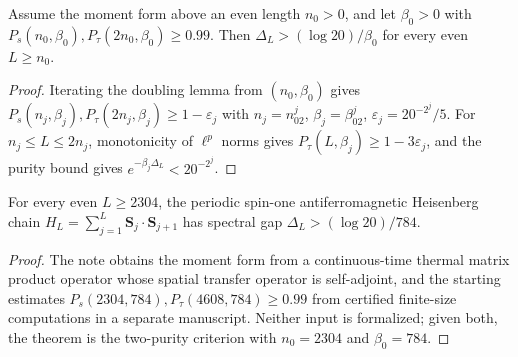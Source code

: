 \begin{proposition}\label{prop:two_purity_criterion}
    \leanok
    Assume the moment form above an even length $n_0>0$, and let $\beta_0>0$
    with $P_s(n_0,\beta_0),P_\tau(2n_0,\beta_0)\ge0.99$. Then
    $\Delta_L>(\log20)/\beta_0$ for every even $L\ge n_0$.
\end{proposition}

\begin{proof}
    \leanok
    Iterating the doubling lemma from $(n_0,\beta_0)$ gives
    $P_s(n_j,\beta_j),P_\tau(2n_j,\beta_j)\ge1-\varepsilon_j$ with
    $n_j=n_02^j$, $\beta_j=\beta_02^j$, $\varepsilon_j=20^{-2^j}/5$. For
    $n_j\le L\le2n_j$, monotonicity of $\ell^p$ norms gives
    $P_\tau(L,\beta_j)\ge1-3\varepsilon_j$, and the purity bound gives
    $e^{-\beta_j\Delta_L}<20^{-2^j}$.
\end{proof}

\begin{theorem}\label{thm:spin_one_heisenberg_gap}
    For every even $L\ge2304$, the periodic spin-one antiferromagnetic
    Heisenberg chain $H_L=\sum_{j=1}^L\mathbf S_j\cdot\mathbf S_{j+1}$ has
    spectral gap $\Delta_L>(\log20)/784$.
\end{theorem}

\begin{proof}
    The note obtains the moment form from a continuous-time thermal matrix
    product operator whose spatial transfer operator is self-adjoint, and the
    starting estimates $P_s(2304,784),P_\tau(4608,784)\ge0.99$ from certified
    finite-size computations in a separate manuscript. Neither input is
    formalized; given both, the theorem is the two-purity criterion with
    $n_0=2304$ and $\beta_0=784$.
\end{proof}
